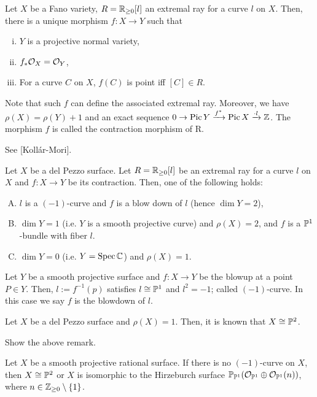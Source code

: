 \documentclass{../../small}
\DeclareMathOperator{\Pic}{Pic}
\begin{document}
\begin{thm}
Let $X$ be a Fano variety, $R=\R_{\ge0}[l]$ an extremal ray for a curve $l$ on $X$.
Then, there is a unique morphism $f:X\to Y$ such that
\begin{enumerate}[(i)]
\item $Y$ is a projective normal variety,
\item $f_*\cO_X=\cO_Y$,
\item For a curve $C$ on $X$, $f(C)$ is point iff $[C]\in R$.
\end{enumerate}
Note that such $f$ can define the associated extremal ray.
Moreover, we have $\rho(X)=\rho(Y)+1$ and an exact sequence $0\to\Pic Y\xrightarrow{f^*}\Pic X\xrightarrow{\cdot l}\Z$.
The morphism $f$ is called the contraction morphism of R.
\end{thm}
\begin{pf}
See [Koll\'ar-Mori].
\end{pf}

\begin{thm}
Let $X$ be a del Pezzo surface.
Let $R=\R_{\ge0}[l]$ be an extremal ray for a curve $l$ on $X$ and $f:X\to Y$ be its contraction.
Then, one of the following holds:
\begin{enumerate}[(A)]
\item $l$ is a $(-1)$-curve and $f$ is a blow down of $l$ (hence $\dim Y=2$),
\item $\dim Y=1$ (i.e. $Y$ is a smooth projective curve) and $\rho(X)=2$, and $f$ is a $\P^1$-bundle with fiber $l$.
\item $\dim Y=0$ (i.e. $Y=\Spec\C$) and $\rho(X)=1$.
\end{enumerate}
\end{thm}

\begin{rmk}
Let $Y$ be a smooth projective surface and $f:X\to Y$ be the blowup at a point $P\in Y$.
Then, $l:=f^{-1}(p)$ satisfies $l\cong\P^1$ and $l^2=-1$; called $(-1)$-curve.
In this case we say $f$ is the blowdown of $l$.
\end{rmk}

\begin{rmk}
Let $X$ be a del Pezzo surface and $\rho(X)=1$.
Then, it is known that $X\cong\P^2$.
\end{rmk}

\begin{exe}
Show the above remark.
\end{exe}

\begin{rmk}
Let $X$ be a smooth projective rational surface.
If there is no $(-1)$-curve on $X$, then $X\cong \P^2$ or $X$ is isomorphic to the Hirzeburch surface $\P_{\P^1}(\cO_{\P^1}\oplus\cO_{\P^1}(n))$, where $n\in\Z_{\ge0}\setminus\{1\}$.
\end{rmk}
\end{document}
